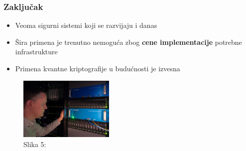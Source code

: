 \documentclass{beamer}
\begin{document}
\begin{frame}[fragile]\frametitle{Zaključak}
\bigskip
	\begin{itemize}
        \item Veoma sigurni sistemi koji se razvijaju i danas
        \item Šira primena je trenutno nemoguća zbog \textbf{cene implementacije} potrebne infrastrukture
	    \item Primena kvantne kriptografije u budućnosti je izvesna
	\end{itemize}
    \begin{figure}[h!]
        \centering
        \includegraphics[height=3cm]{sl4.jpeg} 
        \caption{Slika 5: }
        \label{fig:toshiba}
        \end{figure}
\end{frame}
\end{document}
